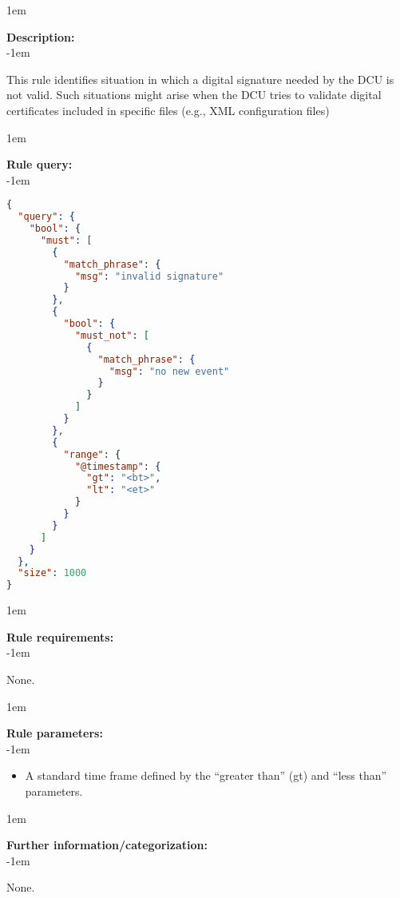 \openup 1em

{\bf Description:} \\

\openup -1em
\vspace{-2em}


This rule identifies situation in which a digital signature needed by the DCU is not valid. Such situations might arise when the DCU tries to validate digital certificates included in specific files (e.g., XML configuration files)

\openup 1em

{\bf Rule query:} \\

\openup -1em
\vspace{-2em}

\begin{lstlisting}[language=json,firstnumber=1]
{
  "query": {
    "bool": {
      "must": [
        {
          "match_phrase": {
            "msg": "invalid signature"
          }
        },
        {
          "bool": {
            "must_not": [
              {
                "match_phrase": {
                  "msg": "no new event"
                }
              }
            ]
          }
        },
        {
          "range": {
            "@timestamp": {
              "gt": "<bt>",
              "lt": "<et>"
            }
          }
        }
      ]
    }
  },
  "size": 1000
}
\end{lstlisting}

\openup 1em

{\bf Rule requirements:} \\

\openup -1em
\vspace{-2em}

None.

\openup 1em

{\bf Rule parameters:} \\

\openup -1em
\vspace{-2em}

\begin{itemize}
	\item A standard time frame defined by the ``greater than'' (gt) and ``less than'' parameters.
\end{itemize}

\openup 1em

{\bf Further information/categorization:} \\

\openup -1em
\vspace{-2em}

None.

\pagebreak